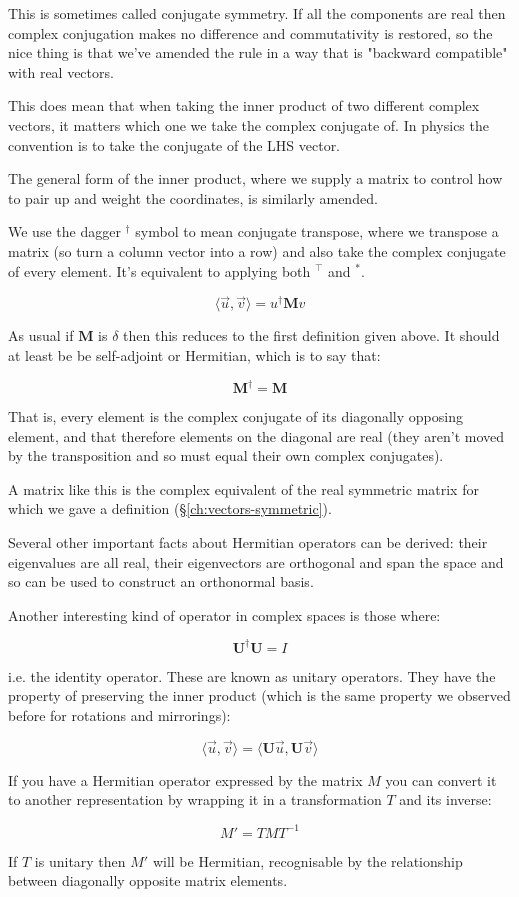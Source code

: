 This is sometimes called conjugate symmetry. If all the components are real then complex conjugation makes no difference and commutativity is restored, so the nice thing is that we've amended the rule in a way that is "backward compatible" with real vectors.

This does mean that when taking the inner product of two different complex vectors, it matters which one we take the complex conjugate of. In physics the convention is to take the conjugate of the LHS vector.

The general form of the inner product, where we supply a matrix to control how to pair up and weight the coordinates, is similarly amended.

We use the dagger $^\dagger$ symbol to mean conjugate transpose, where we transpose a matrix (so turn a column vector into a row) and also take the complex conjugate of every element. It's equivalent to applying both $^\intercal$ and $^*$.

$$
\langle \vec{u}, \vec{v} \rangle
=
u^\dagger \mathbf{M} v
$$

As usual if $\mathbf{M}$ is $\delta$ then this reduces to the first definition given above. It should at least be be self-adjoint or Hermitian, which is to say that:

$$\mathbf{M}^\dagger = \mathbf{M}$$

That is, every element is the complex conjugate of its diagonally opposing element, and that therefore elements on the diagonal are real (they aren't moved by the transposition and so must equal their own complex conjugates).

A matrix like this is the complex equivalent of the real symmetric matrix for which we gave a definition (§\ref{ch:vectors-symmetric}).

Several other important facts about Hermitian operators can be derived: their eigenvalues are all real, their eigenvectors are orthogonal and span the space and so can be used to construct an orthonormal basis.

Another interesting kind of operator in complex spaces is those where:

$$\mathbf{U}^\dagger \mathbf{U} = I$$

i.e. the identity operator. These are known as unitary operators. They have the property of preserving the inner product (which is the same property we observed before for rotations and mirrorings):

$$\langle \vec{u}, \vec{v} \rangle = \langle \mathbf{U} \vec{u}, \mathbf{U} \vec{v} \rangle$$

If you have a Hermitian operator expressed by the matrix $M$ you can convert it to another representation by wrapping it in a transformation $T$ and its inverse:

$$M' = T M T^{-1}$$

If $T$ is unitary then $M'$ will be Hermitian, recognisable by the relationship between diagonally opposite matrix elements.